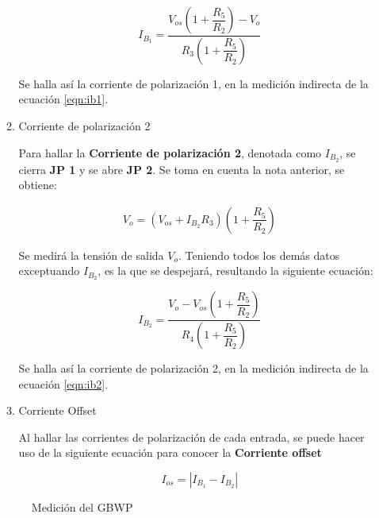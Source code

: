 \begin{enumerate}[label=\textbf{\arabic*.}, font=\bfseries]
\begin{enumerate}
            \begin{equation}
                I_{B_1}=\dfrac{V_{os}\left(1+\dfrac{R_5}{R_2}\right)-V_o}{R_3\left(1+\dfrac{R_5}{R_2}\right)}
                \label{eqn:ib1}
            \end{equation}

            Se halla así la corriente de polarización 1, en la medición indirecta de la ecuación \ref{eqn:ib1}.

        \item Corriente de polarización 2

            Para hallar la \textbf{Corriente de polarización 2}, denotada como $I_{B_2}$, se cierra \textbf{JP 1} y se abre \textbf{JP 2}. Se toma en cuenta la nota anterior, se obtiene:

             \begin{align*}
                V_{o} = (V_{os}+I_{B_2}R_3)\left(1+\dfrac{R_5}{R_2}\right)      
            \end{align*}

            Se medirá la tensión de salida $V_o$. Teniendo todos los demás datos exceptuando $I_{B_2}$, es la que se despejará, resultando la siguiente ecuación:

            \begin{equation}
                I_{B_2}=\dfrac{V_o-V_{os}\left(1+\dfrac{R_5}{R_2}\right)}{R_4\left(1+\dfrac{R_5}{R_2}\right)}
                \label{eqn:ib2}
            \end{equation}

            Se halla así la corriente de polarización 2, en la medición indirecta de la ecuación \ref{eqn:ib2}.

        \item Corriente Offset

            Al hallar las corrientes de polarización de cada entrada, se puede hacer uso de la siguiente ecuación para conocer la \textbf{Corriente offset}

            \begin{equation}
                I_{os}=\left|I_{B_1}-I_{B_2}\right|
                \label{eqn:ios}
            \end{equation}
            
    \end{enumerate}

    \begin{figure}[H]
      \centering
      
      \caption{Medición del GBWP}
      \label{fig:GBWP}
    \end{figure}


\end{enumerate}
